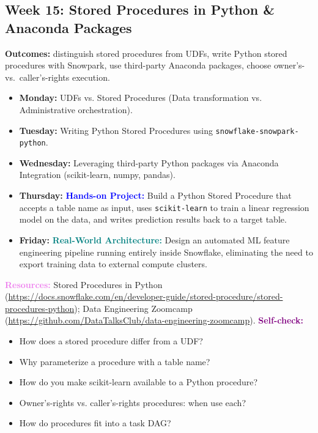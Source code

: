 \documentclass[11pt, a4paper]{article}
\newcommand{\project}[1]{\textbf{\textcolor{blue}{Hands-on Project:}} #1}
\newcommand{\usecase}[1]{\textbf{\textcolor{teal}{Real-World Architecture:}} #1}
\newcommand{\dayitem}[2]{\item \textbf{#1:} #2}
\newcommand{\resources}[1]{\vspace{1mm}\noindent\textbf{\textcolor{violet}{Resources:}} #1}
\newcommand{\selfcheck}[1]{\vspace{1mm}\noindent\textbf{\textcolor{purple}{Self-check:}} #1}
\begin{document}
\subsection*{Week 15: Stored Procedures in Python \& Anaconda Packages}
\par\noindent\textbf{Outcomes:} distinguish stored procedures from UDFs, write Python stored procedures with Snowpark, use third-party Anaconda packages, choose owner's- vs.\ caller's-rights execution.
\begin{itemize}[label=-]
    \dayitem{Monday}{UDFs vs. Stored Procedures (Data transformation vs. Administrative orchestration).}
    \dayitem{Tuesday}{Writing Python Stored Procedures using \texttt{snowflake-snowpark-python}.}
    \dayitem{Wednesday}{Leveraging third-party Python packages via Anaconda Integration (scikit-learn, numpy, pandas).}
    \dayitem{Thursday}{\project{Build a Python Stored Procedure that accepts a table name as input, uses \texttt{scikit-learn} to train a linear regression model on the data, and writes prediction results back to a target table.}}
    \dayitem{Friday}{\usecase{Design an automated ML feature engineering pipeline running entirely inside Snowflake, eliminating the need to export training data to external compute clusters.}}
\end{itemize}
\resources{Stored Procedures in Python (\url{https://docs.snowflake.com/en/developer-guide/stored-procedure/stored-procedures-python}); Data Engineering Zoomcamp (\url{https://github.com/DataTalksClub/data-engineering-zoomcamp}).}
\selfcheck{\begin{itemize}[label=-, nosep, leftmargin=4mm]
    \item How does a stored procedure differ from a UDF?
    \item Why parameterize a procedure with a table name?
    \item How do you make scikit-learn available to a Python procedure?
    \item Owner's-rights vs. caller's-rights procedures: when use each?
    \item How do procedures fit into a task DAG?
\end{itemize}}
\end{document}

